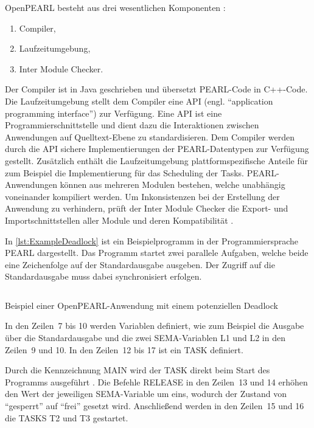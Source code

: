 OpenPEARL besteht aus drei wesentlichen Komponenten
\autocite{OpenPEARL_Structure}:
\begin{enumerate}
  \item Compiler,
  \item Laufzeitumgebung,
  \item Inter Module Checker.
\end{enumerate}
Der Compiler ist in Java geschrieben und übersetzt PEARL-Code in C++-Code. Die
Laufzeitumgebung stellt dem Compiler eine API (engl. "`application programming
interface"') zur Verfügung. Eine API ist eine Programmierschnittstelle und dient
dazu die Interaktionen zwischen Anwendungen auf Quelltext-Ebene zu
standardisieren. Dem Compiler werden durch die API sichere Implementierungen der
PEARL-Datentypen zur Verfügung gestellt. Zusätzlich enthält die Laufzeitumgebung
plattformspezifische Anteile für zum Beispiel die Implementierung für das
Scheduling der Tasks. PEARL-Anwendungen können aus mehreren Modulen bestehen,
welche unabhängig voneinander kompiliert werden. Um Inkonsistenzen bei der
Erstellung der Anwendung zu verhindern, prüft der Inter Module Checker die
Export- und Importschnittstellen aller Module und deren Kompatibilität
\autocite{OpenPEARL_Structure}.

In \cref{lst:ExampleDeadlock} ist ein Beispielprogramm in der Programmiersprache
PEARL dargestellt. Das Programm startet zwei parallele Aufgaben, welche beide
eine Zeichenfolge auf der Standardausgabe ausgeben. Der Zugriff auf die
Standardausgabe muss dabei synchronisiert erfolgen.
\begin{listing}[ht]
  \inputminted[frame=lines,linenos]{vim}{./Examples/Example_Deadlock.prl}
  \caption{Beispiel einer OpenPEARL-Anwendung mit einem potenziellen Deadlock}
  \label{lst:ExampleDeadlock}   
\end{listing} 
In den Zeilen~7 bis 10 werden Variablen definiert, wie zum Beispiel die Ausgabe
über die Standardausgabe und die zwei \textrm{SEMA}-Variablen \textrm{L1} und
\textrm{L2} in den Zeilen~9 und 10. In den Zeilen~12 bis 17 ist ein \textrm{TASK}
definiert.

Durch die Kennzeichnung \textrm{MAIN} wird der \textrm{TASK} direkt beim Start
des Programms ausgeführt \autocite[vgl.][28]{PEARL}. Die Befehle
\textrm{RELEASE} in den Zeilen~13 und 14 erhöhen den Wert der jeweiligen
\textrm{SEMA}-Variable um eins, wodurch der Zustand von "`gesperrt"' auf
"`frei"' gesetzt wird. Anschließend werden in den Zeilen~15 und 16 die
\textrm{TASKS} \textrm{T2} und \textrm{T3} gestartet.

